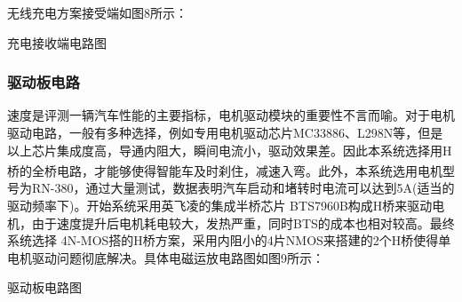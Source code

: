 \documentclass{article}%
\begin{document}
\begin{multicols}{2}
		无线充电方案接受端如图8所示：
		\begin{center}
			\caption{充电接收端电路图}		
		\end{center}
		
		\subsubsection{驱动板电路}
		
		速度是评测一辆汽车性能的主要指标，电机驱动模块的重要性不言而喻。对于电机驱动电路，一般有多种选择，例如专用电机驱动芯片MC33886、L298N等，但是以上芯片集成度高，导通内阻大，瞬间电流小，驱动效果差。因此本系统选择用H桥\textsuperscript{\cite{ref4}}的全桥电路，才能够使得智能车及时刹住，减速入弯。此外，本系统选用电机型号为RN-380，通过大量测试，数据表明汽车启动和堵转时电流可以达到5A(适当的驱动频率下)。开始系统采用英飞凌的集成半桥芯片 BTS7960B构成H桥来驱动电机，由于速度提升后电机耗电较大，发热严重，同时BTS的成本也相对较高。最终系统选择 4N-MOS搭的H桥方案，采用内阻小的4片NMOS来搭建的2个H桥使得单电机驱动问题彻底解决。具体电磁运放电路图如图9所示：

		\begin{center}
			\caption{驱动板电路图}		
		\end{center}
				

\end{multicols}
\end{document}

